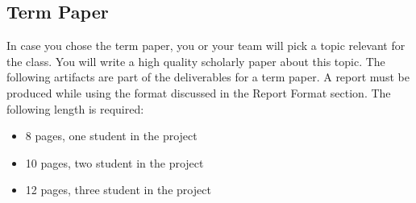 \subsection{Term Paper}

In case you chose the term paper, you or your team will pick a topic
relevant for the class. You will write a high quality scholarly paper
about this topic. The following artifacts are part of the deliverables
for a term paper. A report must be produced while using the format
discussed in the Report Format section. The following length is
required:

\begin{itemize}
\item 8 pages, one student in the project
\item 10 pages, two student in the project
\item 12 pages, three student in the project
\end{itemize}


